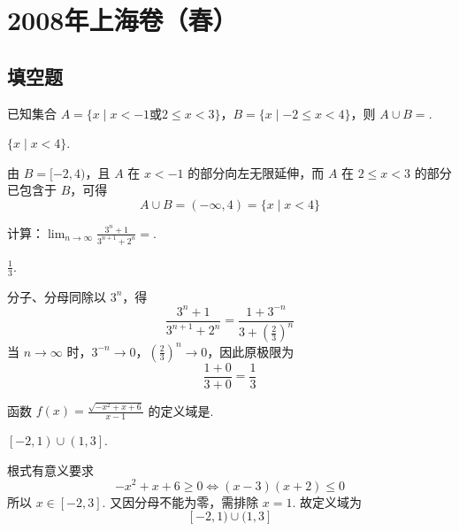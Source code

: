 \chapter{2008年上海卷（春）}

\section{填空题}

\begin{problem}
已知集合 \(A=\{x \mid x<-1\text{或}2\leqslant x<3\}\)，\(B=\{x \mid -2\leqslant x<4\}\)，则 \(A\cup B=\)\fillinblank{}.
\end{problem}

\begin{answer}
\(\{x \mid x<4\}\).
\end{answer}

\begin{solution}
由 \(B=[-2,4)\)，且 \(A\) 在 \(x<-1\) 的部分向左无限延伸，而 \(A\) 在 \(2\leqslant x<3\) 的部分已包含于 \(B\)，可得
\[
A\cup B=(-\infty,4)=\{x\mid x<4\}
\]
\end{solution}

\begin{problem}
计算：\(\displaystyle\lim_{n\to\infty}\frac{3^n+1}{3^{n+1}+2^n}=\)\fillinblank{}.
\end{problem}

\begin{answer}
\(\frac{1}{3}\).
\end{answer}

\begin{solution}
分子、分母同除以 \(3^n\)，得
\[
\frac{3^n+1}{3^{n+1}+2^n}
=\frac{1+3^{-n}}{3+(\frac{2}{3})^n}
\]
当 \(n\to\infty\) 时，\(3^{-n}\to0\)，\((\frac{2}{3})^n\to0\)，因此原极限为
\[
\frac{1+0}{3+0}=\frac13
\]
\end{solution}

\begin{problem}
函数 \(f(x)=\frac{\sqrt{-x^2+x+6}}{x-1}\) 的定义域是\fillinblank{}.
\end{problem}

\begin{answer}
\(\left[-2,1\right)\cup\left(1,3\right]\).
\end{answer}

\begin{solution}
根式有意义要求
\[
-x^2+x+6\geqslant0
\iff (x-3)(x+2)\leqslant0
\]
所以 \(x\in[-2,3]\). 又因分母不能为零，需排除 \(x=1\). 故定义域为
\[
[-2,1)\cup(1,3]
\]
\end{solution}

